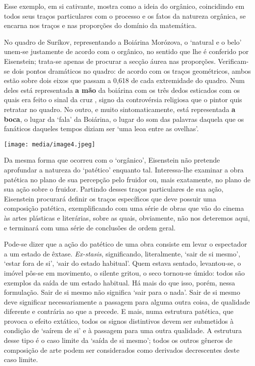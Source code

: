 Esse exemplo, em si cativante, mostra como a ideia do orgânico,
coincidindo em todos seus traços particulares com o processo e os fatos
da natureza orgânica, se encarna nos traços e nas proporções do domínio
da matemática.

No quadro de Suríkov, representando a Boiárina Morózova, o `natural e o
belo' unem-se justamente de acordo com o orgânico, no sentido que lhe é
conferido por Eisenstein; trata-se apenas de procurar a secção áurea nas
proporções. Verificam-se dois pontos dramáticos no quadro: de acordo com
os traços geométricos, ambos estão sobre dois eixos que passam a 0,618
de cada extremidade do quadro. Num deles está representada \textbf{a
mão} da boiárina com os três dedos esticados com os quais era feito o
sinal da cruz , signo da controvérsia religiosa que o pintor quis
retratar no quadro. No outro, e muito sintomaticamente, está
representada \textbf{a boca}, o lugar da `fala' da Boiárina, o lugar do
som das palavras daquela que os fanáticos daqueles tempos diziam ser
`uma leoa entre as ovelhas'.

\texttt{[image: media/image4.jpeg]}

Da mesma forma que ocorreu com o `orgânico', Eisenstein não pretende
aprofundar a natureza do `patético' enquanto tal. Interessa-lhe examinar
a obra patética no plano de sua percepção pelo fruidor ou, mais
exatamente, no plano de sua ação sobre o fruidor. Partindo desses traços
particulares de sua ação, Eisenstein procurará definir os traços
específicos que deve possuir uma composição patética, exemplificando com
uma série de obras que vão do cinema às artes plásticas e literárias,
sobre as quais, obviamente, não nos deteremos aqui, e terminará com uma
série de conclusões de ordem geral.

Pode-se dizer que a ação do patético de uma obra consiste em levar o
espectador a um estado de êxtase. \emph{Ex-stasis}, significando,
literalmente, `sair de si mesmo', `estar fora de si', `sair do estado
habitual'. Quem estava sentado, levantou-se, o imóvel pôs-se em
movimento, o silente gritou, o seco tornou-se úmido: todos são exemplos
da saída de um estado habitual. Há mais do que isso, porém, nessa
formulação. Sair de si mesmo não significa `sair para o nada'. Sair de
si mesmo deve significar necessariamente a passagem para alguma outra
coisa, de qualidade diferente e contrária ao que a precede. E mais, numa
estrutura patética, que provoca o efeito extático, todos os signos
distintivos devem ser submetidos à condição de `saírem de si' e à
passagem para uma outra qualidade. A estrutura desse tipo é o caso
limite da `saída de si mesmo'; todos os outros gêneros de composição de
arte podem ser considerados como derivados decrescentes deste caso
limite.

